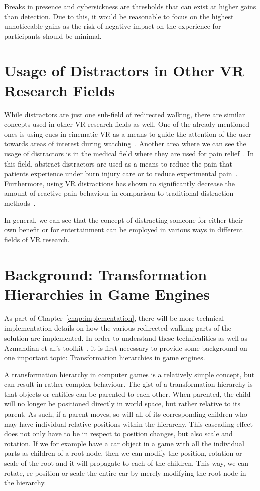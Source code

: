 Breaks in presence and cybersickness are thresholds that can exist at higher gains than detection. Due to this, it would be reasonable to focus on the highest unnoticeable gains as the risk of negative impact on the experience for participants should be minimal. 

\section{Usage of Distractors in Other VR Research Fields}
While distractors are just one sub-field of redirected walking, there are similar concepts used in other VR research fields as well. One of the already mentioned ones is using cues in cinematic VR as a means to guide the attention of the user towards areas of interest during watching~\cite{nielsen2016missing}. Another area where we can see the usage of distractors is in the medical field where they are used for pain relief~\cite{malloy2010effectiveness, knight2018virtual}. In this field, abstract distractors are used as a means to reduce the pain that patients experience under burn injury care or to reduce experimental pain~\cite{malloy2010effectiveness}. Furthermore, using VR distractions has shown to significantly decrease the amount of reactive pain behaviour in comparison to traditional distraction methods~\cite{knight2018virtual}. 

In general, we can see that the concept of distracting someone for either their own benefit or for entertainment can be employed in various ways in different fields of VR research.

\section{Background: Transformation Hierarchies in Game Engines}
As part of Chapter~\ref{chap:implementation}, there will be more technical implementation details on how the various redirected walking parts of the solution are implemented. In order to understand these technicalities as well as Azmandian et al.'s toolkit~\cite{azmandian2016redirected}, it is first necessary to provide some background on one important topic: Transformation hierarchies in game engines.

A transformation hierarchy in computer games is a relatively simple concept, but can result in rather complex behaviour. The gist of a transformation hierarchy is that objects or entities can be parented to each other. When parented, the child will no longer be positioned directly in world space, but rather relative to its parent. As such, if a parent moves, so will all of its corresponding children who may have individual relative positions within the hierarchy. This cascading effect does not only have to be in respect to position changes, but also scale and rotation. If we for example have a car object in a game with all the individual parts as children of a root node, then we can modify the position, rotation or scale of the root and it will propagate to each of the children. This way, we can rotate, re-position or scale the entire car by merely modifying the root node in the hierarchy.

